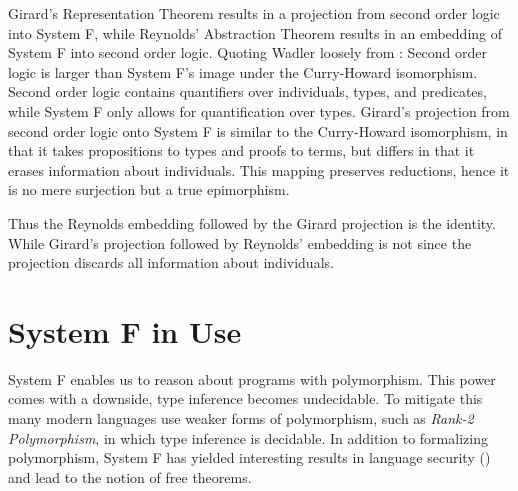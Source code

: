 Girard's Representation Theorem results in a projection from second order logic into System F, while Reynolds' Abstraction Theorem results in an embedding of System F into second order logic.  Quoting Wadler loosely from \cite{Wadlergirard}: Second order logic is larger than System F's image under the Curry-Howard isomorphism. Second order logic contains quantifiers over individuals, types, and predicates, while System F only allows for quantification over types. Girard's projection from second order logic onto System F is similar to the Curry-Howard isomorphism, in that it takes propositions to types and proofs to terms, but differs in that it erases information about individuals. This mapping preserves reductions, hence it is no mere surjection but a true epimorphism.

Thus the Reynolds embedding followed by the Girard projection is the identity. While Girard's projection followed by Reynolds' embedding is not since the projection discards all information about individuals.

\section{System F in Use}
System F enables us to reason about programs with polymorphism. This power comes with a downside, type inference becomes undecidable. To mitigate this many modern languages use weaker forms of polymorphism, such as \emph{Rank-2 Polymorphism}, in which type inference is decidable. In addition to formalizing polymorphism, System F has yielded interesting results in language security (\cite{infoFlow}) and lead to the notion of free theorems.
